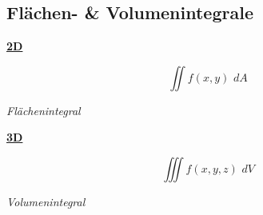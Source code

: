 \subsection{Flächen- \& Volumenintegrale}
    \vspace{0.5em}
    \begin{minipage}{0.4\linewidth}
        \begin{center}
            \underline{\textbf{2D}}
        \end{center}
        $$
            \iint f(x,y) \,\, dA
        $$
        \begin{center}
            \textit{Flächenintegral}
        \end{center}
    \end{minipage}
    \hspace{0.05\linewidth}
    \begin{minipage}{0.5\linewidth}
        \begin{center}
            \underline{\textbf{3D}}
        \end{center}
        $$
           \iiint f(x,y,z) \,\, dV
        $$
        \begin{center}
            \textit{Volumenintegral}
        \end{center}
    \end{minipage}